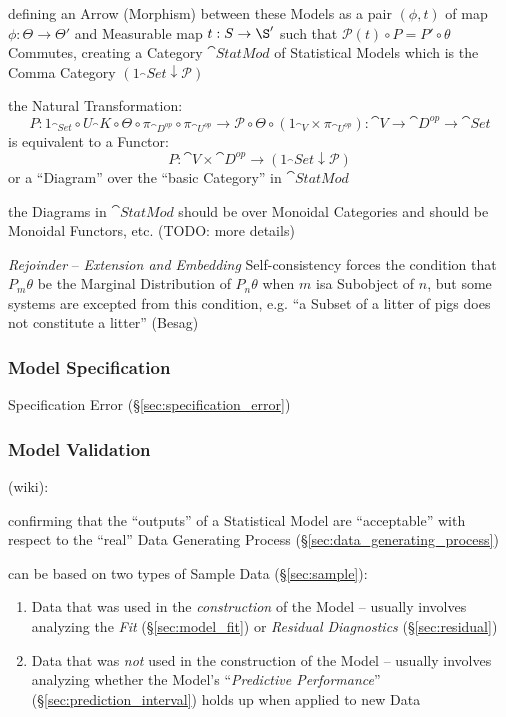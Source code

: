 defining an Arrow (Morphism) between these Models as a pair $(\phi, t)$ of map
$\phi : \Theta \to \Theta'$ and Measurable map $t : S \to \S'$ such that
$\mathcal{P}(t) \circ P = P' \circ \theta$ Commutes, creating a Category
$\cat{StatMod}$ of Statistical Models which is the Comma Category
$(1_\cat{Set} \downarrow \mathcal{P})$

the Natural Transformation:
\[
  P : 1_{\cat{Set}} \circ U_\cat{K} \circ \Theta \circ \pi_{\cat{D}^{op}}
      \circ \pi_{\cat{U}^{op}}
    \to \mathcal{P} \circ \Theta \circ (1_{\cat{V}} \times \pi_{\cat{U}^{op}})
    : \cat{V} \to \cat{D}^{op} \to \cat{Set}
\]
is equivalent to a Functor:
\[
  P : \cat{V} \times \cat{D}^{op} \to (1_\cat{Set} \downarrow \mathcal{P})
\]
or a ``Diagram'' over the ``basic Category'' in $\cat{StatMod}$

the Diagrams in $\cat{StatMod}$ should be over Monoidal Categories and should be
Monoidal Functors, etc. (TODO: more details)

\emph{Rejoinder} -- \emph{Extension and Embedding} Self-consistency forces the
condition that $P_m\theta$ be the Marginal Distribution of $P_n\theta$ when $m$
isa  Subobject of $n$, but some systems are excepted from this condition, e.g.
``a Subset of a litter of pigs does not constitute a litter'' (Besag)



\subsubsection{Model Specification}\label{sec:model_specification}

\fist Specification Error (\S\ref{sec:specification_error})



\subsubsection{Model Validation}\label{sec:model_validation}

(wiki):

confirming that the ``outputs'' of a Statistical Model are ``acceptable'' with
respect to the ``real'' Data Generating Process
(\S\ref{sec:data_generating_process})

can be based on two types of Sample Data (\S\ref{sec:sample}):
\begin{enumerate}
  \item Data that was used in the \emph{construction} of the Model -- usually
    involves analyzing the \emph{Fit} (\S\ref{sec:model_fit}) or \emph{Residual
      Diagnostics} (\S\ref{sec:residual})
  \item Data that was \emph{not} used in the construction of the Model --
    usually involves analyzing whether the Model's ``\emph{Predictive
      Performance}'' (\S\ref{sec:prediction_interval}) holds up when applied to
    new Data
\end{enumerate}



